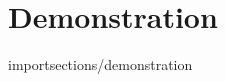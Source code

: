 \documentclass[12pt]{article}
\begin{document}
\doublespacing


















\section*{Demonstration}

import{sections/}{demonstration}



\end{document}
